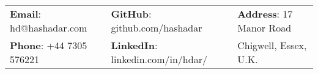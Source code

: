 \documentclass[letterpaper, 11pt]{article}
\begin{document}


\vspace{0.5cm}
\begin{center}
    \begin{tabular}{lll}
        \textbf{Email}: hd@hashadar.com                         &
        \hspace{0.4in} \textbf{GitHub}: github.com/hashadar     &
        \hspace{0.3in} 	\textbf{Address}: 17 Manor Road            \\

        \textbf{Phone}: +44 7305 576221                         &
        \hspace{0.4in} \textbf{LinkedIn}: linkedin.com/in/hdar/ &
        \hspace{0.3in} Chigwell, Essex, U.K.
    \end{tabular}
\end{center}


\setlength{\tabcolsep}{8pt}
\end{document}
